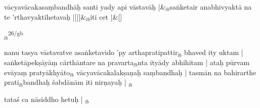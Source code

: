 \documentclass[article,12pt,a4paper]{memoir}%
\newcounter{parCount}
\begin{document}
	    \stanza[\smallbreak]
	  vācyavācakasaṃbandhāḥ santi yady api vāstavāḥ |&{\tiny $_{lb}$}saṅketair anabhivyaktā na te 'rthavyaktihetavaḥ |[|]&{\tiny $_{lb}$}iti cet |\&[\smallbreak]
	  
	  
	  {\tiny $_{lb}$}\textsuperscript{\textenglish{26/gb}}

	  
	  \pstart \leavevmode%
	nanu tasya vāstavatve asaṅketavido 'py arthapratipattir{\tiny $_{lb}$} bhaved ity uktam | saṅketāpekṣāyāṃ cārthāntare na pravarta{\tiny $_{lb}$}nta  ityādy  abhihitam | ataḥ pūrvam evāyaṃ pratyākhyāto{\tiny $_{lb}$} vācyavācakalakṣaṇaḥ saṃbandhaḥ | tasmān na bahirarthe prati{\tiny $_{lb}$}bandhaḥ śabdānām iti nirṇayaḥ |
	{}
	\pend%
      {\tiny $_{lb}$}

	  
	  \pstart \leavevmode%
	tataś ca nāsiddho hetuḥ |
	{}
	\pend%
      {\tiny $_{lb}$}
\end{document}
